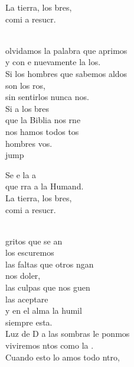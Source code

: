 \begin{cancion}
\begin{chorus}
	La tierra, los bres,\\
	comi a resucr.\\
	\end{chorus}%
	\jump\\
	olvidamos la palabra que aprimos\\
	y con e nuevamente la los.\\
	Si los hombres que sabemos aldos\\
	son los ros, \\
	sin sentirlos nunca nos.\\
	Si a los bres \\
	que la Biblia nos rne \\
	nos hamos todos tos \\
	hombres vos.\\jump\\
	\begin{chorus}%
	Se e la a\\
	que rra a la Humand.\\
	La tierra, los bres,\\
	comi a resucr.\\
	\end{chorus}%
	\jump\\
	 gritos que se an \\
	los escuremos\\
	las faltas que otros ngan \\
	nos doler,\\
	las culpas que nos guen \\
	las aceptare\\
	y en el alma la humil \\
	siempre esta.\\
	Luz de D a las sombras le ponmos\\
	viviremos ntos como la .\\
	Cuando esto lo amos todo ntro,\\

\end{cancion}
